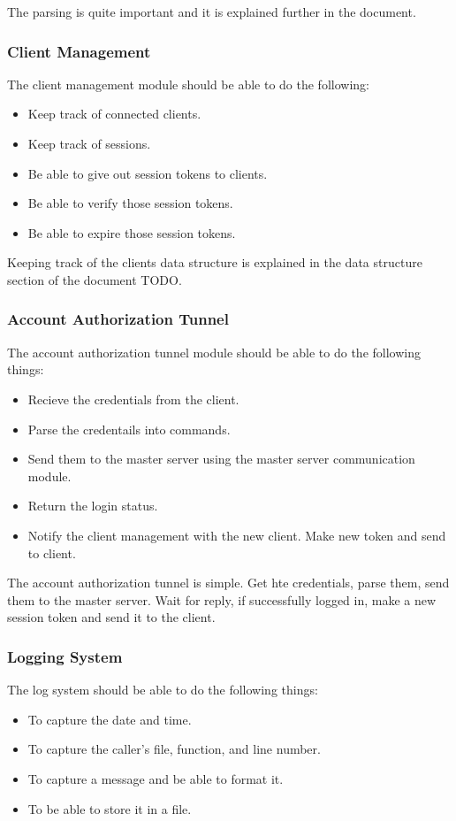 \documentclass[a4paper]{article}
\begin{document}
The parsing is quite important and it is explained further in the document.

\subsubsection{Client Management}
\label{worker_mods_client}
The client management module should be able to do the following:
\begin{itemize}
	\item Keep track of connected clients.
	\item Keep track of sessions.
	\item Be able to give out session tokens to clients.
	\item Be able to verify those session tokens.
	\item Be able to expire those session tokens.
\end{itemize}

Keeping track of the clients data structure is explained in the data structure
section of the document TODO.

\subsubsection{Account Authorization Tunnel}
\label{worker_mods_acc}
The account authorization tunnel module should be able to do the following
things:
\begin{itemize}
	\item Recieve the credentials from the client.
	\item Parse the credentails into commands.
	\item Send them to the master server using the master server communication
		module.
	\item Return the login status.
	\item Notify the client management with the new client. Make new token and
		send to client.
\end{itemize}

The account authorization tunnel is simple. Get hte credentials, parse them,
send them to the master server. Wait for reply, if successfully logged in, make
a new session token and send it to the client.

\subsubsection{Logging System}
\label{worker_mods_log}
The log system should be able to do the following things:
\begin{itemize}
	\item To capture the date and time.
	\item To capture the caller's file, function, and line number.
	\item To capture a message and be able to format it.
	\item To be able to store it in a file.
\end{itemize}
\end{document}
